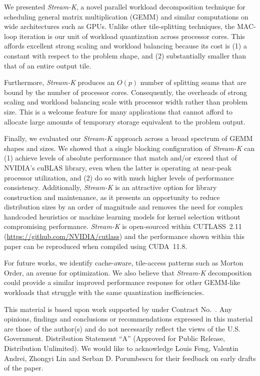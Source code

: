 We presented \emph{Stream-K}, a novel parallel workload decomposition technique for scheduling general matrix multiplication (GEMM) and similar computations on wide architectures such as GPUs. Unlike other tile-splitting techniques, the MAC-loop iteration is our unit of workload quantization across processor cores. This affords excellent strong scaling and workload balancing because its cost is (1) a constant with respect to the problem shape, and (2) substantially smaller than that of an entire output tile.

Furthermore, \emph{Stream-K} produces an $O(p)$ number of splitting seams that are bound by the number of processor cores. Consequently, the overheads of strong scaling and workload balancing scale with processor width rather than problem size. This is a welcome feature for many applications that cannot afford to allocate large amounts of temporary storage equivalent to the problem output.

Finally, we evaluated our \emph{Stream-K} approach across a broad spectrum of GEMM shapes and sizes.  We showed that a single blocking configuration of
\emph{Stream-K} can (1) achieve levels of absolute performance that match and/or exceed that of NVIDIA's cuBLAS library, even when the latter is operating at near-peak processor utilization, and (2) do so with much higher levels of performance consistency. Additionally, \emph{Stream-K} 
is an attractive option for library construction and maintenance, as it presents an opportunity to reduce distribution sizes by an order of magnitude and removes the need for complex handcoded heuristics or machine learning models for kernel selection without compromising performance.
\emph{Stream-K} is open-sourced within CUTLASS~2.11 (\url{https://github.com/NVIDIA/cutlass}) and the performance shown within this paper can be reproduced when compiled using CUDA~11.8.

For future works, we identify cache-aware, tile-access patterns such as Morton Order, an avenue for optimization. We also believe that 
\emph{Stream-K} decomposition could provide a similar improved performance response for other GEMM-like workloads that struggle with the same quantization inefficiencies.

\begin{acks}
    This material is based upon work supported by  under Contract No.~. Any opinions, findings and conclusions or recommendations expressed in this material are those of the author(s) and do not necessarily reflect the views of the U.S. Government. Distribution Statement ``A'' (Approved for Public Release, Distribution Unlimited). We would like to acknowledge Louis Feng, Valentin Andrei, Zhongyi Lin and Serban D. Porumbescu for their feedback on early drafts of the paper.
\end{acks}


